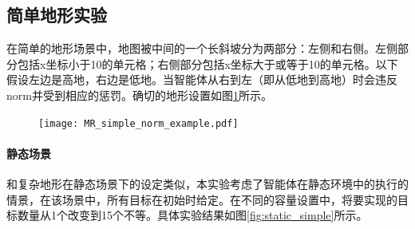 

\subsection{简单地形实验}
在简单的地形场景中，地图被中间的一个长斜坡分为两部分：左侧和右侧。左侧部分包括x坐标小于10的单元格；右侧部分包括x坐标大于或等于10的单元格。以下假设左边是高地，右边是低地。当智能体从右到左（即从低地到高地）时会违反norm并受到相应的惩罚。确切的地形设置如图\ref{fig:simple}所示。
\begin{figure}[H]
\centering
\texttt{[image: MR\_simple\_norm\_example.pdf]}
\captionsetup{justification=centering}
\label{fig:simple}
\end{figure}

\paragraph{静态场景}
和复杂地形在静态场景下的设定类似，本实验考虑了智能体在静态环境中的执行的情景，在该场景中，所有目标在初始时给定。在不同的容量设置中，将要实现的目标数量从1个改变到15个不等。具体实验结果如图\ref{fig:static_simple}所示。


